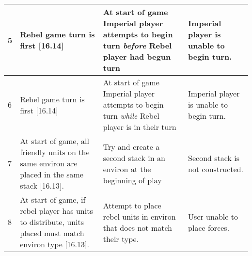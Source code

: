 \begin{center}
\begin{longtable}{| p{.5cm} | p{4.5cm} | p{4.5cm} | p{4.5cm} |}
    \\ \hline

    5 &
    Rebel game turn is first [16.14] &

    At start of game Imperial player attempts to begin turn
    \textit{before} Rebel player had begun turn &
    
    Imperial player is unable to begin turn.

    \\ \hline 

    6 &
    Rebel game turn is first [16.14] &

    At start of game Imperial player attempts to begin turn
    \textit{while} Rebel player is in their turn &

    Imperial player is unable to begin turn.

    \\ \hline 

    7 &

    At start of game, all friendly units on the same environ are
    placed in the same stack [16.13]. &

    Try and create a second stack in an environ at the beginning of
    play &

    Second stack is not constructed.

    \\ \hline

    8 &

    At start of game, if rebel player has units to distribute, units
    placed must match environ type [16.13]. &

    Attempt to place rebel units in environ that does not match their
    type. &

    User unable to place forces.

    \\ \hline 

  \end{longtable}

\end{center}
